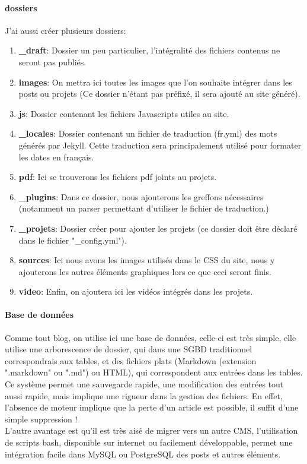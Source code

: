 \documentclass[11pt,a4paper]{report}
\begin{document}
			\paragraph{dossiers}J'ai aussi créer plusieurs dossiers:
				\begin{enumerate}
					\item \textbf{\_draft}:					Dossier un peu particulier, l'intégralité des fichiers contenus ne seront pas publiés.
					\item \textbf{images}:					On mettra ici toutes les images que l'on souhaite intégrer dans les posts ou projets (Ce dossier n'étant pas préfixé, il sera ajouté au site généré).
					\item \textbf{js}:						Dossier contenant les fichiers Javascripts utiles au site.
					\item \textbf{\_locales}:				Dossier contenant un fichier de traduction (fr.yml) des mots générés par Jekyll. Cette traduction sera principalement utilisé pour formater les dates en français.
					\item \textbf{pdf}:						Ici se trouverons les fichiers pdf joints au projets.
					\item \textbf{\_plugins}:				Dans ce dossier, nous ajouterons les greffons nécessaires (notamment un parser permettant d'utiliser le fichier de traduction.)
					\item \textbf{\_projets}:				Dossier créer pour ajouter les projets (ce dossier doit être déclaré dans le fichier "\_config.yml").
					\item \textbf{sources}:					Ici nous avons les images utilisés dans le CSS du site, nous y ajouterons les autres éléments graphiques lors ce que ceci seront finis.
					\item \textbf{video}:					Enfin, on ajoutera ici les vidéos intégrés dans les projets.
				\end{enumerate}
			\paragraph{Base de données}Comme tout blog, on utilise ici une base de données, celle-ci est très simple, elle utilise une arborescence de dossier, qui dans une SGBD traditionnel correspondrais aux tables, et des fichiers plats (Markdown (extension ".markdown" ou ".md") ou HTML), qui correspondent aux entrées dans les tables.\\
			Ce système permet une sauvegarde rapide, une modification des entrées tout aussi rapide, mais implique une rigueur dans la gestion des fichiers. En effet, l'absence de moteur implique que la perte d'un article est possible, il suffit d'une simple suppression !\\
			L'autre avantage est qu'il est très aisé de migrer vers un autre CMS, l'utilisation de scripts bash, disponible sur internet ou facilement développable, permet une intégration facile dans MySQL ou PostgreSQL des posts et autres éléments.
\end{document}
